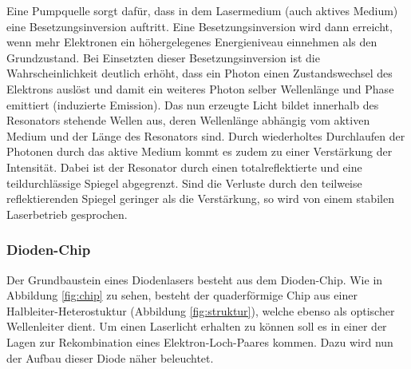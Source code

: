 Eine Pumpquelle sorgt dafür, dass in dem Lasermedium (auch aktives Medium)
eine Besetzungsinversion auftritt. Eine Besetzungsinversion wird dann erreicht,
wenn mehr Elektronen ein höhergelegenes Energieniveau einnehmen als den
Grundzustand. Bei Einsetzten dieser Besetzungsinversion ist
die Wahrscheinlichkeit deutlich erhöht, dass ein Photon einen Zustandswechsel
des Elektrons auslöst und damit ein weiteres Photon selber Wellenlänge
und Phase emittiert (induzierte Emission). Das nun erzeugte Licht bildet innerhalb
des Resonators stehende Wellen aus, deren Wellenlänge abhängig vom aktiven Medium und
der Länge des Resonators sind. Durch wiederholtes Durchlaufen der Photonen durch
das aktive Medium kommt es zudem zu einer Verstärkung der Intensität. Dabei ist der
Resonator durch einen totalreflektierte
und eine teildurchlässige Spiegel abgegrenzt. Sind die Verluste durch den teilweise
reflektierenden Spiegel geringer als die Verstärkung, so wird von einem stabilen
Laserbetrieb gesprochen.


\subsubsection{Dioden-Chip}
Der Grundbaustein eines Diodenlasers besteht aus dem Dioden-Chip. Wie in
Abbildung \ref{fig:chip} zu sehen, besteht der quaderförmige Chip aus einer
Halbleiter-Heterostuktur (Abbildung \ref{fig:struktur}), welche ebenso als
optischer Wellenleiter dient. Um
einen Laserlicht erhalten zu können soll es in einer der Lagen zur Rekombination
eines Elektron-Loch-Paares kommen. Dazu wird nun der Aufbau dieser Diode näher
beleuchtet.


